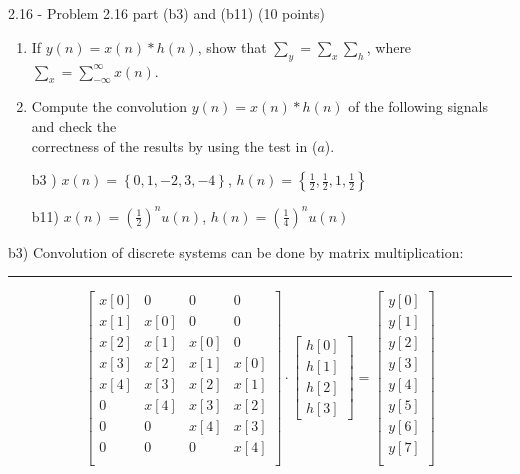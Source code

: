 \documentclass[a4paper, 11pt]{exam}
\begin{document}
\section{} 
2.16 - Problem 2.16 part (b3) and (b11) (10 points)
\newline
\begin{enumerate}
\item If $y(n) = x(n) \ast h(n)$, show that $\sum_y = \sum_x\sum_h$, where $\sum_x = \sum_{-\infty}^{\infty}x(n)$.
\item Compute the convolution $y(n) = x(n) \ast h(n)$ of the following signals and check the \\ correctness of the results by using the test in ($a$).
\end{enumerate}

\begin{enumerate}
  \item  [b3   )] $x(n) = \left\lbrace0, 1, -2, 3, -4\right\rbrace$, $ h(n) = \left\lbrace \frac{1}{2} , \frac{1}{2} , 1, \frac{1}{2} \right\rbrace$
  \item  [b11)] $x(n) =\left(\frac{1}{2}\right)^n u(n)$, $ h(n) =\left( \frac{1}{4}\right)^n u(n)$
\end{enumerate}
\newpage
\vspace{1em}
b3) Convolution of discrete systems can be done by matrix multiplication:
\hrule
\begin{center}
\[
\begin{bmatrix}
x[0]&0&0&0\\
x[1]&x[0]&0&0\\
x[2]&x[1]&x[0]&0\\
x[3]&x[2]&x[1]&x[0]\\
x[4]&x[3]&x[2]&x[1]\\
0&x[4]&x[3]&x[2]\\
0&0&x[4]&x[3]\\
0&0&0&x[4]\\

\end{bmatrix} 
\cdot
\begin{bmatrix}
h[0]\\
h[1]\\
h[2]\\
h[3]
\end{bmatrix}
=
\begin{bmatrix}
y[0]\\
y[1]\\
y[2]\\
y[3]\\
y[4]\\
y[5]\\
y[6]\\
y[7]\\
\end{bmatrix}
\]
\end{center}
\end{document}
